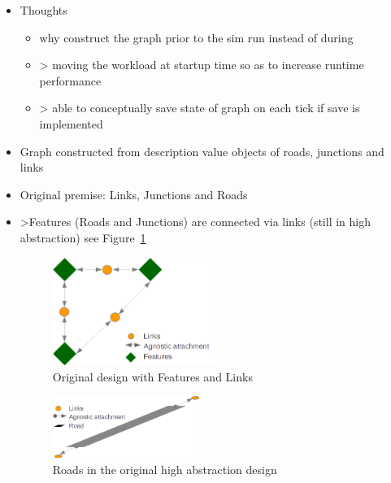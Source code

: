 \begin{itemize}
	\item Thoughts
    \begin{itemize}
        \item why construct the graph prior to the sim run instead of during
        \item > moving the workload at startup time so as to increase runtime performance
        \item > able to conceptually save state of graph on each tick if save is implemented
    \end{itemize}
    \item Graph constructed from description value objects of roads, junctions and links
    \item Original premise: Links, Junctions and Roads
    \item >Features (Roads and Junctions) are connected via links (still in high abstraction) see Figure~\ref{fig:FeatureConnect}

    \begin{figure}[h]
        \vspace{1.5em}
        \caption{Original design with Features and Links}
        \label{fig:FeatureConnect}
        \centering
        \includegraphics[width=0.50\textwidth]{figs/graphConstruction/OriginalConnections.png}
        \vspace{1.5em}
    \end{figure}

    \begin{figure}[h]
        \vspace{1.5em}
        \caption{Roads in the original high abstraction design}
        \label{fig:RoadsOriginal}
        \centering
        \includegraphics[width=0.45\textwidth]{figs/graphConstruction/OriginalRoads.png}
        \vspace{1.5em}
    \end{figure}


\end{itemize}
